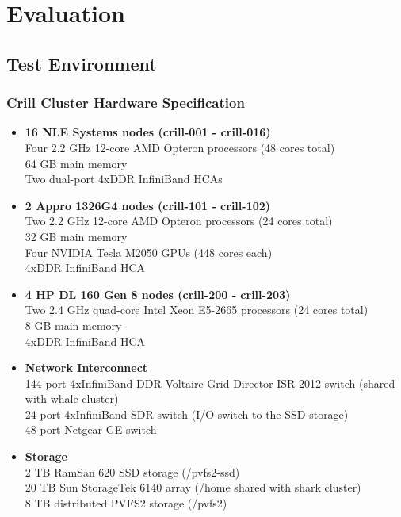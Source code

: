\chapter{Evaluation}
\label{sec:Evaluation}

\section{Test Environment}

\subsection{Crill Cluster Hardware Specification}
\begin{itemize}
\item \textbf{16 NLE Systems nodes (crill-001 - crill-016)}\\
  Four 2.2 GHz 12-core AMD Opteron processors (48 cores total)\\
  64 GB main memory\\
  Two dual-port 4xDDR InfiniBand HCAs

\item \textbf{2 Appro 1326G4 nodes (crill-101 - crill-102)}\\
  Two 2.2 GHz 12-core AMD Opteron processors (24 cores total)\\
  32 GB main memory\\
  Four NVIDIA Tesla M2050 GPUs (448 cores each)\\
  4xDDR InfiniBand HCA

\item \textbf{4 HP DL 160 Gen 8 nodes (crill-200 - crill-203)}\\
  Two 2.4 GHz quad-core Intel Xeon E5-2665 processors (24 cores total)\\
  8 GB main memory\\
  4xDDR InfiniBand HCA
  
\item \textbf{Network Interconnect}\\
  144 port 4xInfiniBand DDR Voltaire Grid Director ISR 2012 switch (shared with whale cluster)\\
  24 port 4xInfiniBand SDR switch (I/O switch to the SSD storage)\\
  48 port Netgear GE switch

\item \textbf{Storage}\\
  2 TB RamSan 620 SSD storage (/pvfs2-ssd)\\
  20 TB Sun StorageTek 6140 array (/home shared with shark cluster)\\
  8 TB distributed PVFS2 storage (/pvfs2)
  
\end{itemize}

